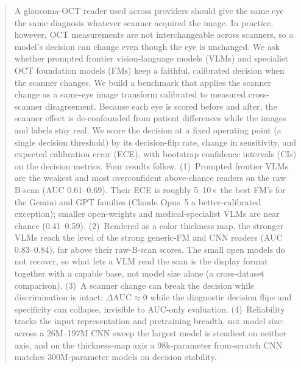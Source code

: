 
\begin{abstract}
A glaucoma-OCT reader used across providers should give the same eye the same diagnosis whatever scanner
acquired the image. In practice, however, OCT measurements are not interchangeable across scanners, so a
model's decision can change even though the eye is unchanged. We ask whether prompted frontier vision-language models (VLMs) and specialist OCT foundation models (FMs)
keep a faithful, calibrated decision when the scanner changes. We build a benchmark that applies the scanner change
as a same-eye image transform calibrated to measured cross-scanner disagreement. Because each eye is scored before
and after, the scanner effect is de-confounded from patient differences while the images and labels stay real. We
score the decision at a fixed operating point (a single decision threshold) by its decision-flip rate, change in
sensitivity, and expected calibration error (ECE), with bootstrap confidence intervals (CIs) on the decision metrics. Four results follow.
(1)~Prompted frontier VLMs are the weakest and most overconfident above-chance readers on the raw B-scan (AUC
\num{0.61}--\num{0.69}). Their ECE is roughly 5--10$\times$ the best FM's for the Gemini and GPT families (Claude
Opus~5 a better-calibrated exception); smaller open-weights and medical-specialist VLMs are near chance
(\num{0.41}--\num{0.59}).
(2)~Rendered as a color thickness map, the stronger VLMs reach the level of the strong generic-FM and CNN readers
(AUC \num{0.83}--\num{0.84}), far above their raw-B-scan scores. The small open models do not recover, so what lets a
VLM read the scan is the display format together with a capable base, not model size alone (a cross-dataset
comparison). (3)~A scanner change can break the decision while discrimination is intact:
$\Delta$AUC$\approx$0 while the diagnostic decision flips and specificity can collapse, invisible to AUC-only
evaluation. (4)~Reliability tracks the input representation and pretraining breadth, not model size: across a
26M--197M CNN sweep the largest model is steadiest on neither axis, and on the thickness-map axis a 98k-parameter
from-scratch CNN matches 300M-parameter models on decision stability.
\end{abstract}

